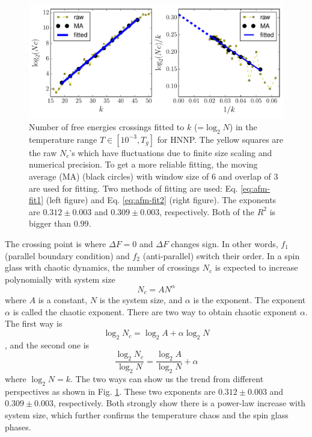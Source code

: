 \begin{figure}
\centering \includegraphics[width=0.8\columnwidth]{Chapter-3/chaotic_exponents_freeE_binning.pdf}
\protect\caption{Number of free energies crossings fitted to $k$ (=$\log_2 N$) in the temperature range $T \in [10^{-3}, T_g]$ for HNNP. The yellow squares are the raw $N_c$'s which have fluctuations due to finite size scaling and numerical precision. To get a more reliable fitting, the moving average (MA) (black circles) with window size of 6 and overlap of 3 are used for fitting. Two methods of fitting are used: Eq. \ref{eq:afm-fit1} (left figure) and Eq. \ref{eq:afm-fit2} (right figure). The exponents are $0.312\pm 0.003$ and $0.309 \pm 0.003$, respectively. Both of the $R^2$ is bigger than $0.99$.}
\label{fig:afm-freeEfit} 
\end{figure}

The crossing point is where $\Delta F = 0$ and $\Delta F$ changes sign. In other words, $f_1$  (parallel boundary condition) and $f_2$ (anti-parallel) switch their order. In a spin glass with chaotic dynamics, the number of crossings $N_c$ is expected to increase polynomially with system size \cite{wang2015chaos}
\begin{equation}
N_c = A N^\alpha
\end{equation}
where $A$ is a constant, $N$ is the system size, and $\alpha$ is the exponent. The exponent $\alpha$ is called the chaotic exponent. There are two way to obtain chaotic exponent $\alpha$. The first way is 
\begin{equation}
\log_2 N_c = \log_2 A + \alpha \log_2 N
\label{eq:afm-fit1}
\end{equation}
, and the second one is 
\begin{equation}
\frac{\log_2 N_c }{\log_2 N } =\frac {\log_2 A }{\log_2{N}} + \alpha 
\label{eq:afm-fit2}
\end{equation}
where $\log_2 N = k$. The two ways can show us the trend from different perspectives as shown in Fig. \ref{fig:afm-freeEfit}. 
These two exponents are $0.312\pm 0.003$ and $0.309 \pm 0.003$, respectively. Both strongly show there is a power-law increase with system size, which further confirms the temperature chaos and the spin glass phases.

